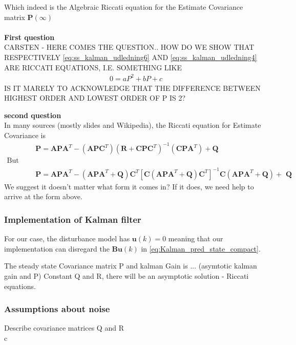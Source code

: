 Which indeed is the Algebraic Riccati equation for the Estimate Covariance matrix $\textbf{P}(\infty)$\\
\\

\textbf{First question}\\

CARSTEN - HERE COMES THE QUESTION.. HOW DO WE SHOW THAT RESPECTIVELY \cref{eq:ss_kalman_udledning6} AND \cref{eq:ss_kalman_udledning4} ARE RICCATI EQUATIONS, I.E. SOMETHING LIKE
\begin{align}
	&0 = aP^2 + bP + c 
\end{align}
IS IT MARELY TO ACKNOWLEDGE THAT THE DIFFERENCE BETWEEN HIGHEST ORDER AND LOWEST ORDER OF P IS 2?

\textbf{second question}\\
In many sources (mostly slides and Wikipedia), the Riccati equation for Estimate Covariance is 
\begin{align}
	&\textbf{P} = \textbf{APA}^T - (\textbf{APC}^T)(\textbf{R}+\textbf{CPC}^T)^{-1}(\textbf{CPA}^T)+\textbf{Q}  \\
	\text{But the closest we can get is } \\
	&\textbf{P} = \textbf{APA}^T - (\textbf{APA}^T+ \textbf{Q})\textbf{C}^T[\textbf{C}(\textbf{APA}^T+\textbf{Q})\textbf{C}^T]^{-1}\textbf{C}(\textbf{APA}^T + \textbf{Q}) + \textbf{ Q}
\end{align}
We suggest it doesn't matter what form it comes in? If it does, we need help to arrive at the form above.

\subsubsection{Implementation of Kalman filter}
For our case, the disturbance model has $ \textbf{u}(k)=0 $ meaning that our implementation can disregard the $ \textbf{B}\textbf{u}(k) $ in \cref{eq:Kalman_pred_state_compact}.


The steady state Covariance matrix P and kalman Gain is ... (asymtotic kalman gain and P)
Constant Q and R, there will be an asymptotic solution - Riccati equations. 

\subsubsection{Assumptions about noise}
Describe covariance matrices Q and R\\


c